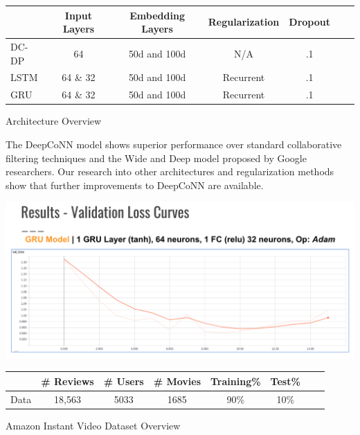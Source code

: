 \documentclass[10pt,twocolumn,letterpaper]{article}
\begin{document}
\begin{exhibit}
\begin{center}
{\small
\begin{tabular}{l|cccccc}
\hline
 & Input Layers & Embedding Layers & Regularization & Dropout  \\
\hline
DC-DP & 64 & 50d and 100d & N/A & .1  \\
LSTM & 64 \& 32 & 50d and 100d & Recurrent & .1 \\
GRU & 64 \& 32 & 50d and 100d  & Recurrent & .1 \\
\hline
\end{tabular}
}
\end{center}
\caption{Architecture Overview}
\end{exhibit}






The DeepCoNN model shows superior performance over standard collaborative filtering techniques and the Wide and Deep model proposed by Google researchers. Our research into other architectures and regularization methods show that further improvements to DeepCoNN are available.   

\includegraphics[scale=0.38]{Loss_Graph.png}


\begin{exhibit}
\begin{center}
{\small
\begin{tabular}{l|ccccccc}
\hline
 & \# Reviews & \# Users & \# Movies & Training\% & Test\% \\
\hline
Data & 18,563  & 5033 & 1685 & 90\% & 10\%  \\
\hline
\end{tabular}
}
\end{center}
\caption{Amazon Instant Video Dataset Overview}
\end{exhibit}
\end{document}

